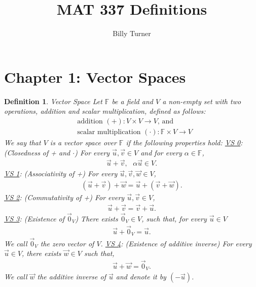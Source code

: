 \documentclass[12pt,answers]{exam}
\newtheorem{definition}{Definition}[section]
\begin{document}
\title{MAT 337 Definitions} 
\author{Billy Turner}
\maketitle
\thispagestyle{empty}

\section{Chapter 1: Vector Spaces}
\begin{definition}{Vector Space}
Let $\mathbb{F}$ be a field and $V$ a non-empty set with two operations, addition and scalar multiplication, defined as follows:
\begin{align*}
	&\text{addition } (+):  V \times V \rightarrow V \text{, and} \\
	&\text{scalar multiplication } (\cdot): \mathbb{F} \times V \rightarrow V
\end{align*}
We say that $V$ is a vector space over $\mathbb{F}$ if the following properties hold:
\newline\newline\noindent
\underline{VS 0}: (Closedness of + and $\cdot$) For every $\vec{u},\vec{v}\in V$ and for every $\alpha\in \mathbb{F}$,
\begin{align*}
	\vec{u}+\vec{v},\text{ } \alpha\vec{u}\in V.
\end{align*}
\noindent
\underline{VS 1}: (Associativity of +) For every $\vec{u},\vec{v},\vec{w}\in V$,
\begin{align*}
	(\vec{u}+\vec{v})+\vec{w}=\vec{u}+(\vec{v}+\vec{w}).
\end{align*}
\noindent
\underline{VS 2}: (Commutativity of +) For every $\vec{u},\vec{v}\in V$,
\begin{align*}
	\vec{u}+\vec{v}=\vec{v}+\vec{u}.
\end{align*}
\noindent
\underline{VS 3}: (Existence of $\vec{0}_{V}$) There exists $\vec{0}_{V}\in V$, such that, for every $\vec{u}\in V$
\begin{align*}
	\vec{u}+\vec{0}_{V}=\vec{u}.
\end{align*}
We call $\vec{0}_{V}$ the zero vector of $V$.
\newline\newline\noindent
\underline{VS 4}: (Existence of additive inverse) For every $\vec{u}\in V$, there exists $\vec{w}\in V$ such that,
\begin{align*}
	\vec{u}+\vec{w}=\vec{0}_{V}.
\end{align*}
We call $\vec{w}$ the additive inverse of $\vec{u}$ and denote it by $(-\vec{u})$.

\end{definition}
\end{document}
